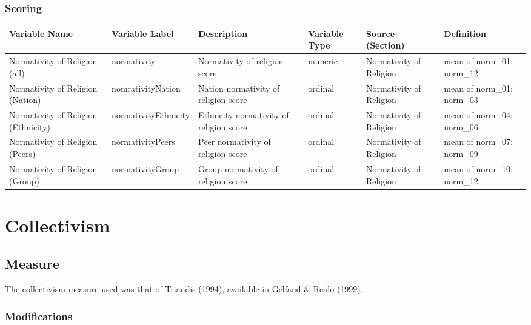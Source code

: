 \documentclass[
  letterpaper,
]{scrbook}
\begin{document}
\subsection{Scoring}\label{scoring-2}

\begin{tabu} to 
\toprule
Variable Name & Variable Label & Description & Variable Type & Source (Section) & Definition\\
\midrule
Normativity of Religion (all) & normativity & Normativity of religion score & numeric & Normativity of Religion & mean of norm\_01: norm\_12\\
Normativity of Religion (Nation) & nomrativityNation & Nation normativity of religion score & ordinal & Normativity of Religion & mean of norm\_01: norm\_03\\
Normativity of Religion (Ethnicity) & normativityEthnicity & Ethnicity normativity of religion score & ordinal & Normativity of Religion & mean of norm\_04: norm\_06\\
Normativity of Religion (Peers) & normativityPeers & Peer normativity of religion score & ordinal & Normativity of Religion & mean of norm\_07: norm\_09\\
Normativity of Religion (Group) & normativityGroup & Group normativity of religion score & ordinal & Normativity of Religion & mean of norm\_10: norm\_12\\
\bottomrule
\end{tabu}

\chapter{Collectivism}\label{collectivism}

\section{Measure}\label{measure-3}

The collectivism measure used was that of Triandis (1994), available in
Gelfand \& Realo (1999).

\subsection*{Modifications}\label{modifications-3}
\end{document}
